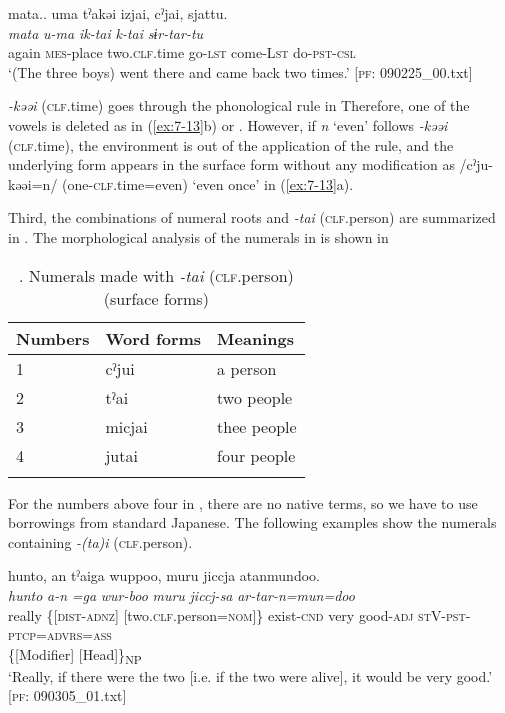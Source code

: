 \ex \label{ex:7:13b}{\TM}
\glll  mata..  uma  tˀakəi  izjai,  cˀjai,  sjattu.\\
\textit{mata}  \textit{u-ma}  \textit{}  \textit{ik-tai}  \textit{k-tai}  \textit{sɨr-tar-tu}\\
again  \textsc{mes}-place  two.\textsc{clf}.time  go-\textsc{lst}  come-L\textsc{st}  do-\textsc{pst}-\textsc{csl}\\
\glt ‘(The three boys) went there and came back two times.’ [\textsc{pf}: 090225\_00.txt]

\z
\z

\textit{{}-kəəi} (\textsc{clf}.time) goes through the phonological rule in  Therefore, one of the vowels is deleted as in (\ref{ex:7-13}b) or . However, if \textit{n} ‘even’ follows \textit{{}-kəəi} (\textsc{clf}.time), the environment is out of the application of the rule, and the underlying form appears in the surface form without any modification as /cˀju-kəəi=n/ (one-\textsc{clf}.time=even) ‘even once’ in (\ref{ex:7-13}a).

Third, the combinations of numeral roots and \textit{{}-tai} (\textsc{clf}.person) are summarized in . The morphological analysis of the numerals in  is shown in 

\begin{table}
\caption{\label{tab:key:49}. Numerals made with \textit{-tai} (\textsc{clf}.person) (surface forms)}
\begin{tabular}{lll}
\lsptoprule
Numbers  & Word forms  & Meanings\\
\midrule
1&  cˀjui & a person      \\
2&  tˀai  &two people     \\
3&  micjai&  thee people  \\
4&  jutai & four people   \\
\lspbottomrule
\end{tabular}
\end{table}

For the numbers above four in , there are no native terms, so we have to use borrowings from standard Japanese. The following examples show the numerals containing \textit{{}-(ta)i} (\textsc{clf}.person).

\ea \label{ex:7:14}
\ea \label{ex:7:14a}
{\TM}
\gllll  hunto,  an  tˀaiga  wuppoo,  muru   jiccja  atanmundoo.\\
\textit{hunto}  \textit{a-n}  \textit{=ga}  \textit{wur-boo}  \textit{muru}  \textit{jiccj-sa}  \textit{ar-tar-n=mun=doo}\\
really  \{[\textsc{dist}-\textsc{adnz}]  [two.\textsc{clf}.person=\textsc{nom}]\}  exist-\textsc{cnd}  very   good-\textsc{adj}  \textsc{st}V-\textsc{pst}-\textsc{ptcp}=\textsc{advrs}=\textsc{ass}\\
\{[Modifier]  [Head]\}\textsubscript{NP}    \\
\glt ‘Really, if there were the two [i.e. if the two were alive], it would be very good.’ [\textsc{pf}: 090305\_01.txt]

